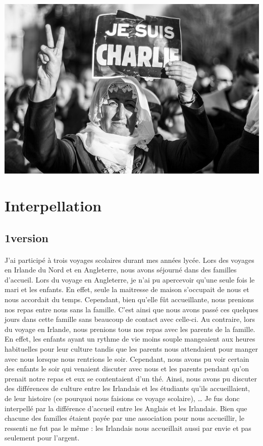 \begin{center}
\includegraphics[scale=0.5]{charlie.jpg}
\end{center}

\section{Interpellation}
\subsection{1\ier version}
\paragraph{}
J’ai participé à trois voyages scolaires durant mes années lycée. Lors des
voyages en Irlande du Nord et en Angleterre, nous avons séjourné dans des
familles d’accueil. Lors du voyage en Angleterre, je n’ai pu apercevoir qu’une
seule fois le mari et les enfants. En effet, seule la maitresse de maison
s’occupait de nous et nous accordait du temps. Cependant, bien qu’elle fût
accueillante, nous prenions nos repas entre nous sans la famille. C’est ainsi
que nous avons passé ces quelques jours dans cette famille sans beaucoup de
contact avec celle-ci. Au contraire, lors du voyage en Irlande, nous prenions
tous nos repas avec les parents de la famille. En effet, les enfants ayant un
rythme de vie moins souple mangeaient aux heures habituelles pour leur culture
tandis que les parents nous attendaient pour manger avec nous lorsque nous
rentrions le soir. Cependant, nous avons pu voir certain des enfants le soir
qui venaient discuter avec nous et les parents pendant qu’on prenait notre
repas et eux se contentaient d’un thé. Ainsi, nous avons pu discuter des
différences de culture entre les Irlandais et les étudiants qu’ils
accueillaient, de leur histoire (ce pourquoi nous faisions ce voyage scolaire),
… Je fus donc interpellé par la différence d’accueil entre les Anglais et les
Irlandais. Bien que chacune des familles étaient payée par une association pour
nous accueillir, le ressenti ne fut pas le même : les Irlandais nous
accueillait aussi par envie et pas seulement pour l’argent.

